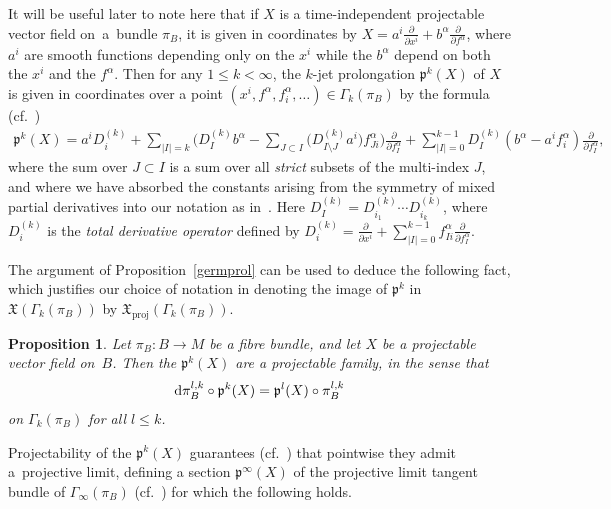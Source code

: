 \documentclass[10pt,a4paper]{amsart}
\numberwithin{equation}{section}
\newtheorem{Proposition}[Theorem]{Proposition}
\def\proj{\operatorname{proj}}
\def\XF{{\mathfrak{X}}}
\def\pf{{\mathfrak{p}}}
\begin{document}
It will be useful later to note here that if $X$ is a time-independent projectable vector field on~a~bundle $\pi_{B}$, it is given in coordinates by $X = a^{i}\frac{\partial}{\partial x^{i}} + b^{\alpha}\frac{\partial}{\partial f^{\alpha}}$, where $a^{i}$ are smooth functions depending only on the $x^{i}$ while the $b^{\alpha}$ depend on both the $x^{i}$ and the $f^{\alpha}$. Then for any $1\leq k<\infty$, the $k$-jet prolongation $\pf^{k}(X)$ of $X$ is given in coordinates over a point $(x^{i},f^{\alpha},f^{\alpha}_{i},\dots)\in \Gamma_{k}(\pi_{B})$ by the formula (cf.~\cite[Theorem~2.36]{olver})
\begin{gather}\label{prolongation}
\pf^{k}(X) = a^{i}D_{i}^{(k)}+\sum_{|I|=k}\!\bigg(D^{(k)}_{I}b^{\alpha}-\sum_{J\subset I}\big(D^{(k)}_{I\setminus J}a^{i}\big)f^{\alpha}_{Ji}\bigg)\frac{\partial}{\partial f^{\alpha}_{I}}+\!\sum_{|I|=0}^{k-1}D^{(k)}_{I}(b^{\alpha}-a^{i}f^{\alpha}_{i})\frac{\partial}{\partial f^{\alpha}_{I}},
\end{gather}
where the sum over $J\subset I$ is a sum over all \textit{strict} subsets of the multi-index $J$, and where we have absorbed the constants arising from the symmetry of mixed partial derivatives into our notation as in~\cite[equation~(1.15)]{varbi}. Here $D^{(k)}_{I} = D^{(k)}_{i_{1}}\cdots D^{(k)}_{i_{k}}$, where $D^{(k)}_{i}$ is the \textit{total derivative operator} defined by $D^{(k)}_{i} = \frac{\partial}{\partial x^{i}}+\sum_{|I|=0}^{k-1}f^{\alpha}_{Ii}\frac{\partial}{\partial f^{\alpha}_{I}}$.

The argument of Proposition~\ref{germprol} can be used to deduce the following fact, which justifies our choice of notation in denoting the image of $\pf^{k}$ in $\XF(\Gamma_{k}(\pi_{B}))$ by $\XF_{\proj}(\Gamma_{k}(\pi_{B}))$.

\begin{Proposition}
Let $\pi_{B}\colon B\rightarrow M$ be a fibre bundle, and let $X$ be a projectable vector field on~$B$. Then the $\pf^{k}(X)$ are a projectable family, in the sense that
\begin{gather*}
{\rm d}\pi_{B}^{l,k}\circ \pf^{k}(X) = \pf^{l}(X)\circ\pi_{B}^{l,k}
\end{gather*}
on $\Gamma_{k}(\pi_{B})$ for all $l\leq k$.
\end{Proposition}

Projectability of the $\pf^{k}(X)$ guarantees (cf.~\cite[equation~(1.11)]{varbi}) that pointwise they admit a~pro\-jective limit, defining a section $\pf^{\infty}(X)$ of the projective limit tangent bundle of $\Gamma_{\infty}(\pi_{B})$ (cf.~\cite[Chapter One, Section B]{varbi}) for which the following holds.
\end{document}
